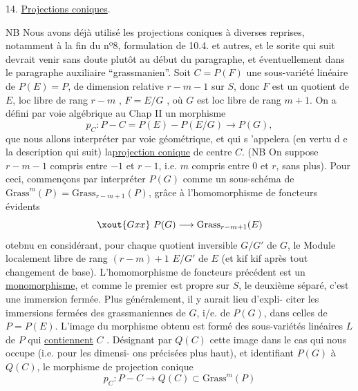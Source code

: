
14. \uline{Projections coniques}.

NB Nous avons déjà utilisé les projections coniques à diverses
\margin{$\|$}reprises, notamment à la fin du nº8, formulation de 10.4. et autres, et
le sorite qui suit devrait venir sans doute plutôt au début du paragraphe,
et éventuellement dans le paragraphe auxiliaire ``grassmanien''.
Soit $C = P(F)$ une sous-variété linéaire de $P(E)=P$, de dimension
relative $r-m-1$  sur $S$, donc $F$ est un quotient de $E$, loc libre de
rang $r-m$ , $F=E/G$ , où $G$ est loc libre de rang $m+1$. On a défini
par voie algébrique au Chap II un morphisme
\[ p_C : P - C = P(E) - P(E/G) \longrightarrow P(G) , \]
que nous allons interpréter par voie géométrique, et qui s 'appelera
(en vertu d e la description qui suit) la\uline{projection conique} de centre $C$.
(NB On suppose $r-m-1$ compris entre $-1$ et $r-1$, i.e. $m$ compris entre $0$
et $r$, sans plus). Pour ceci, commençons par interpréter  $P(G)$
comme un sous-schéma de $\mathrm{Grass}^m(P)= \mathrm{Grass}_{r-m+1}(P)$, grâce à l'homomorphisme
de foncteurs évidents
\[ \xout{Gxx}\ P(G) \longrightarrow \mathrm{Grass}_{r-m+1}(E) \]
otebnu en considérant, pour chaque quotient inversible $G/G'$ de $G$, le
Module localement libre de rang $(r-m)+1$ $E/G'$ de $E$ (et kif kif après
tout changement de base). L'homomorphisme de foncteurs précédent est un
\uline{monomorphisme}, et comme le premier est propre sur $S$, le deuxième séparé,
c'est une immersion fermée. \xout{\unsure{(}}Plus généralement, il y aurait lieu d'expli-%
citer les immersions fermées des grassmaniennes de $G$, i/e. de $P(G)$,
dans celles de  $P=P(E)$.  L'image du morphisme obtenu est formé des
sous-variétés linéaires  $L$ de $P$ qui \uline{contiennent} $C$ . Désignant
par $Q(C)$ cette image dans le cas qui nous occupe (i.e. pour les dimensi-%
ons précisées plus haut), et identifiant $P(G)$ à $Q(C)$, le morphisme
de projection conique
\[ p_C : P - C \longrightarrow Q(C) \subset \mathrm{Grass}^m(P) \]

